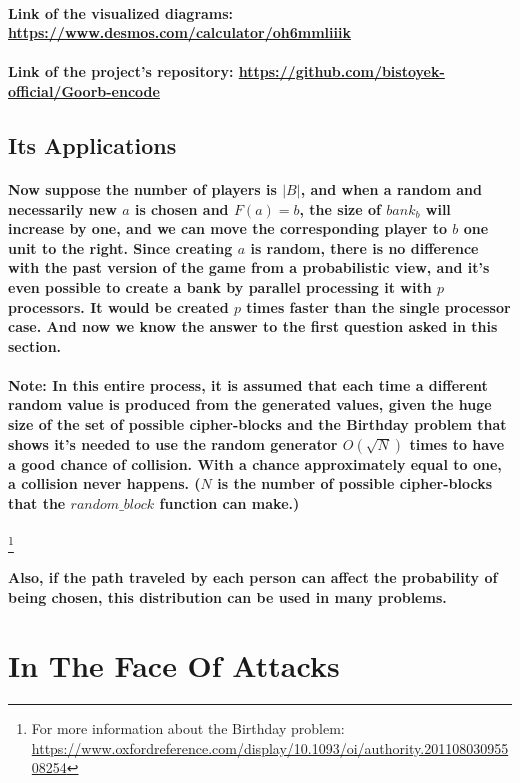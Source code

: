 \documentclass[oneside]{book}
\newcommand{\myparagraph}[1]{\paragraph{\textnormal{#1}}}
\begin{document}
\myparagraph{
Link of the visualized diagrams:\newline \; \href{https://www.desmos.com/calculator/oh6mmliiik}{https://www.desmos.com/calculator/oh6mmliiik}
}

\myparagraph{
Link of the project's repository:\newline \;
\href{https://github.com/bistoyek-official/Goorb-encode}{https://github.com/bistoyek-official/Goorb-encode}
}

\subsection{Its Applications}

\myparagraph{
Now suppose the number of players is $|B|$, and when a random and necessarily new $a$ is chosen and $F(a) = b$, the size of $bank_b$ will increase by one, and we can move the corresponding player to $b$ one unit to the right. Since creating $a$ is random, there is no difference with the past version of the game from a probabilistic view, and it's even possible to create a bank by parallel processing it with $p$ processors. It would be created $p$ times faster than the single processor case. And now we know the answer to the first question asked in this section.
}

\myparagraph{
\textbf{Note:} In this entire process, it is assumed that each time a different random value is produced from the generated values, given the huge size of the set of possible cipher-blocks and the \textbf{Birthday problem} that shows it's needed to use the random generator $O(\sqrt{N})$ times to have a good chance of collision. With a chance approximately equal to one, a collision never happens. ($N$ is the number of possible cipher-blocks that the $random\_block$ function can make.)
}
\footnote{
For more information about the Birthday problem:\newline
\href{https://www.oxfordreference.com/display/10.1093/oi/authority.20110803095508254}{https://www.oxfordreference.com/display/10.1093/oi/authority.20110803095508254}
}

\myparagraph{
Also, if the path traveled by each person can affect the probability of being chosen, this distribution can be used in many problems.
}

\newpage

\section{In The Face Of Attacks}
\end{document}
